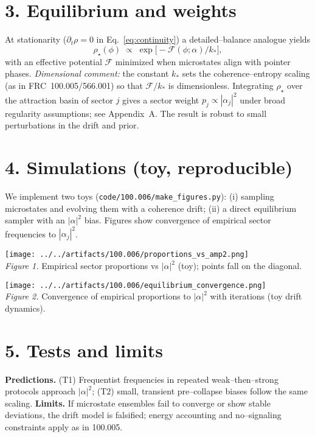 \documentclass[10pt]{article}
\begin{document}
\section*{3. Equilibrium and weights}
At stationarity ($\partial_t\rho=0$ in Eq.~\eqref{eq:continuity}) a detailed--balance analogue yields
\begin{equation}
 \rho_\star(\phi)\;\propto\; \exp\big[-\mathcal{F}(\phi;\alpha)/k_*\big],\label{eq:rhostar}
\end{equation}
with an effective potential $\mathcal{F}$ minimized when microstates align with pointer phases. \textit{Dimensional comment:} the constant $k_*$ sets the coherence--entropy scaling (as in FRC~100.005/566.001) so that $\mathcal{F}/k_*$ is dimensionless. Integrating $\rho_\star$ over the attraction basin of sector $j$ gives a sector weight $p_j\!\propto\!|\alpha_j|^2$ under broad regularity assumptions; see Appendix~A. The result is robust to small perturbations in the drift and prior.

\section*{4. Simulations (toy, reproducible)}
We implement two toys (\verb|code/100.006/make_figures.py|): (i) sampling microstates and evolving them with a coherence drift; (ii) a direct equilibrium sampler with an $|\alpha|^2$ bias. Figures show convergence of empirical sector frequencies to $|\alpha_j|^2$.

\begin{center}
\texttt{[image: ../../artifacts/100.006/proportions\_vs\_amp2.png]}\\
\emph{Figure 1.} Empirical sector proportions vs $|\alpha|^2$ (toy); points fall on the diagonal.
\end{center}

\begin{center}
\texttt{[image: ../../artifacts/100.006/equilibrium\_convergence.png]}\\
\emph{Figure 2.} Convergence of empirical proportions to $|\alpha|^2$ with iterations (toy drift dynamics).
\end{center}

\section*{5. Tests and limits}
\textbf{Predictions.} (T1) Frequentist frequencies in repeated weak--then--strong protocols approach $|\alpha|^2$; (T2) small, transient pre--collapse biases follow the same scaling.\newline
\textbf{Limits.} If microstate ensembles fail to converge or show stable deviations, the drift model is falsified; energy accounting and no--signaling constraints apply as in 100.005.
\end{document}
